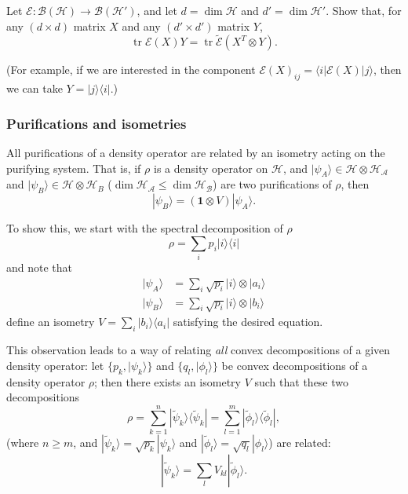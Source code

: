 \documentclass[fleqn]{article}
\begin{document}
Let \(\mathcal{E}\colon\mathcal{B}(\mathcal{H})\to\mathcal{B}(\mathcal{H}')\), and let \(d=\dim\mathcal{H}\) and \(d'=\dim\mathcal{H}'\).
Show that, for any \((d\times d)\) matrix \(X\) and any \((d'\times d')\) matrix \(Y\),
\[
  \operatorname{tr}\mathcal{E}(X)Y
  = \operatorname{tr}\widetilde{\mathcal{E}} (X^T\otimes Y).
\]

(For example, if we are interested in the component \(\mathcal{E}(X)_{ij}=\langle i|\mathcal{E}(X)|j\rangle\), then we can take \(Y=|j\rangle\langle i|\).)

\hypertarget{purifications-and-isometries}{%
\subsubsection{Purifications and isometries}\label{purifications-and-isometries}}

All purifications of a density operator are related by an isometry acting on the purifying system.
That is, if \(\rho\) is a density operator on \(\mathcal{H}\), and \(|\psi_A\rangle\in \mathcal{H}\otimes\mathcal{H}_\mathcal{A}\) and \(|\psi_B\rangle\in\mathcal{H}\otimes\mathcal{H}_B\) (\(\dim\mathcal{H}_\mathcal{A}\leqslant\dim\mathcal{H}_\mathcal{B}\)) are two purifications of \(\rho\), then
\[
  |\psi_B\rangle=(\mathbf{1}\otimes V)|\psi_A\rangle.
\]

To show this, we start with the spectral decomposition of \(\rho\)
\[
  \rho = \sum_i p_i|i\rangle\langle i|
\]
and note that
\[
  \begin{aligned}
    |\psi_A\rangle
    &= \sum_i \sqrt{p_i} |i\rangle\otimes|a_i\rangle
  \\|\psi_B\rangle
    &= \sum_i \sqrt{p_i} |i\rangle\otimes|b_i\rangle
  \end{aligned}
\]
define an isometry \(V=\sum_i |b_i\rangle\langle a_i|\) satisfying the desired equation.

This observation leads to a way of relating \emph{all} convex decompositions of a given density operator: let \(\{p_k,|\psi_k\rangle\}\) and \(\{q_l,|\phi_l\rangle\}\) be convex decompositions of a density operator \(\rho\);
then there exists an isometry \(V\) such that these two decompositions
\[
  \rho
  = \sum_{k=1}^n|\widetilde{\psi}_k\rangle\langle\widetilde{\psi}_k|
  = \sum_{l=1}^m|\widetilde{\phi}_l\rangle\langle\widetilde{\phi}_l|,
\]
(where \(n\geqslant m\), and \(|\widetilde{\psi}_k\rangle=\sqrt{p_k}|\psi_k\rangle\) and \(|\widetilde{ \phi}_l\rangle=\sqrt{q_l}|\phi_l\rangle\)) are related:
\[
  |\widetilde{\psi}_k\rangle = \sum_{l} V_{kl} |\widetilde{\phi}_l\rangle.
\]
\end{document}
